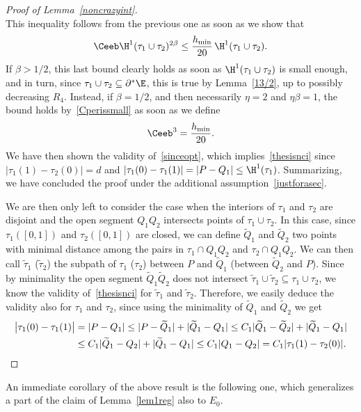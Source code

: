 \begin{proof}[Proof of Lemma~\ref{noncrazyint}]
\begin{equation}
\end{equation}
This inequality follows from the previous one as soon as we show that
\[
\Ceeb \H^1(\tau_1 \cup\tau_2)^{2\beta} \leq \frac{h_{\min}}{20}\,\H^1(\tau_1 \cup\tau_2).
\]
If $\beta>1/2$, this last bound clearly holds as soon as $\H^1(\tau_1 \cup\tau_2)$ is small enough, and in turn, since $\tau_1\cup\tau_2\subseteq\partial^*\E$, this is true by Lemma~\ref{13/2}, up to possibly decreasing $R_4$. Instead, if $\beta=1/2$, and then necessarily $\eta=2$ and $\eta\beta=1$, the bound holds by~\eqref{Cperissmall} as soon as we define
\begin{equation}\label{ceeb3}
\Ceeb^3=\frac{h_{\min}}{20}.
\end{equation}
We have then shown the validity of~\eqref{sinceopt}, which implies~\eqref{thesisnci} since $|\tau_1(1)-\tau_2(0)|=d$ and $|\tau_1(0)-\tau_1(1)|=|P-Q_1|\leq \H^1(\tau_1)$. Summarizing, we have concluded the proof under the additional assumption~\eqref{justforasec}.

We are then only left to consider the case when the interiors of $\tau_1$ and $\tau_2$ are disjoint and the open segment $Q_1Q_2$ intersects points of $\tau_1\cup\tau_2$. In this case, since $\tau_1([0,1])$ and $\tau_2([0,1])$ are closed, we can define $\widetilde Q_1$ and $\widetilde Q_2$ two points with minimal distance among the pairs in $\tau_1\cap Q_1Q_2$ and $\tau_2\cap Q_1Q_2$. We can then call $\tilde \tau_1$ (\resp $\tilde\tau_2$) the subpath of $\tau_1$ (\resp $\tau_2$) between $P$ and $\widetilde Q_1$ (\resp between $\widetilde Q_2$ and $P$). Since by minimality the open segment $\widetilde Q_1\widetilde Q_2$ does not intersect $\tilde\tau_1\cup\tilde\tau_2 \subseteq \tau_1\cup\tau_2$, we know the validity of~\eqref{thesisnci} for $\tilde\tau_1$ and $\tilde\tau_2$. Therefore, we easily deduce the validity also for $\tau_1$ and $\tau_2$, since using the minimality of $\widetilde Q_1$ and $\widetilde Q_2$ we get
\begin{align*}
\big|\tau_1(0)-\tau_1(1)\big| &= |P-Q_1|
\leq |P-\widetilde Q_1| + |\widetilde Q_1 - Q_1|
\leq C_1 |\widetilde Q_1 - \widetilde Q_2 | + |\widetilde Q_1 - Q_1|\\
&\leq C_1 |\widetilde Q_1 - Q_2 | + |\widetilde Q_1 - Q_1|
\leq
C_1 |Q_1-Q_2| = C_1 |\tau_1(1)-\tau_2(0)|.\qedhere
\end{align*}
\end{proof}

An immediate corollary of the above result is the following one, which generalizes a part of the claim of Lemma~\ref{lem1reg} also to $E_0$.

